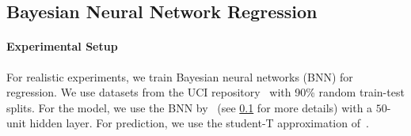 
% 







  \vspace{-0.05in}
\subsection{Bayesian Neural Network Regression}\label{section:bnn}
  \vspace{-0.05in}
\paragraph{Experimental Setup}
For realistic experiments, we train Bayesian neural networks (BNN) for regression.
We use datasets from the UCI repository~\cite{Dua:2019} with 90\% random train-test splits.
For the model, we use the BNN by~\citet{pmlr-v37-hernandez-lobatoc15} (see \cref{section:bnn} for more details) with a \(50\)-unit hidden layer.
For prediction, we use the student-T approximation of~\citet{pmlr-v37-hernandez-lobatoc15}.

